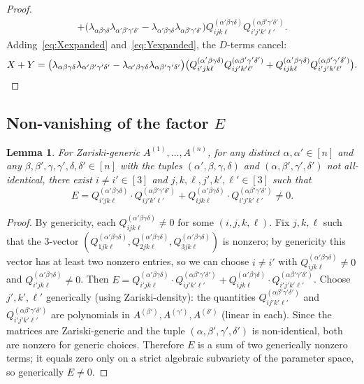 \documentclass[12pt]{article}
\newtheorem{lemma}[theorem]{Lemma}
\begin{document}
\begin{proof}
\begin{align}
  + \bigl(\lambda_{\alpha\beta\gamma\delta}\lambda_{\alpha'\beta'\gamma'\delta'}
    -\lambda_{\alpha'\beta\gamma\delta}\lambda_{\alpha\beta'\gamma'\delta'}\bigr)
    Q^{(\alpha'\beta\gamma\delta)}_{ijk\ell}Q^{(\alpha\beta'\gamma'\delta')}_{i'j'k'\ell'}.
  \label{eq:Yexpanded}
\end{align}
Adding~\eqref{eq:Xexpanded} and~\eqref{eq:Yexpanded}, the $D$-terms cancel:
\[
  X+Y = \bigl(\lambda_{\alpha\beta\gamma\delta}\lambda_{\alpha'\beta'\gamma'\delta'}
    -\lambda_{\alpha'\beta\gamma\delta}\lambda_{\alpha\beta'\gamma'\delta'}\bigr)
    \bigl(Q^{(\alpha'\beta\gamma\delta)}_{i'jk\ell}Q^{(\alpha\beta'\gamma'\delta')}_{ij'k'\ell'}
    + Q^{(\alpha'\beta\gamma\delta)}_{ijk\ell}Q^{(\alpha\beta'\gamma'\delta')}_{i'j'k'\ell'}\bigr). \qedhere
\]
\end{proof}

\subsection{Non-vanishing of the factor \texorpdfstring{$E$}{E}}

\begin{lemma}\label{lem:Enonzero}
For Zariski-generic $A^{(1)},\dots,A^{(n)}$, for any distinct $\alpha,\alpha'\in[n]$ and any
$\beta,\beta',\gamma,\gamma',\delta,\delta'\in[n]$ with the tuples $(\alpha',\beta,\gamma,\delta)$ and
$(\alpha,\beta',\gamma',\delta')$ not all-identical, there exist $i\neq i'\in[3]$ and
$j,k,\ell,j',k',\ell'\in[3]$ such that
\[
  E = Q^{(\alpha'\beta\gamma\delta)}_{i'jk\ell}\cdot Q^{(\alpha\beta'\gamma'\delta')}_{ij'k'\ell'}
    + Q^{(\alpha'\beta\gamma\delta)}_{ijk\ell}\cdot Q^{(\alpha\beta'\gamma'\delta')}_{i'j'k'\ell'} \neq 0.
\]
\end{lemma}

\begin{proof}
By genericity, each $Q^{(\alpha'\beta\gamma\delta)}_{ijk\ell}\neq 0$ for some $(i,j,k,\ell)$.
Fix $j,k,\ell$ such that the $3$-vector $(Q^{(\alpha'\beta\gamma\delta)}_{1jk\ell},
Q^{(\alpha'\beta\gamma\delta)}_{2jk\ell},Q^{(\alpha'\beta\gamma\delta)}_{3jk\ell})$ is nonzero;
by genericity this vector has at least two nonzero entries, so we can choose $i\neq i'$ with
$Q^{(\alpha'\beta\gamma\delta)}_{ijk\ell}\neq 0$ and $Q^{(\alpha'\beta\gamma\delta)}_{i'jk\ell}\neq 0$.
Then $E = Q^{(\alpha'\beta\gamma\delta)}_{i'jk\ell}\cdot Q^{(\alpha\beta'\gamma'\delta')}_{ij'k'\ell'}
+ Q^{(\alpha'\beta\gamma\delta)}_{ijk\ell}\cdot Q^{(\alpha\beta'\gamma'\delta')}_{i'j'k'\ell'}$.
Choose $j',k',\ell'$ generically (using Zariski-density): the quantities
$Q^{(\alpha\beta'\gamma'\delta')}_{ij'k'\ell'}$ and $Q^{(\alpha\beta'\gamma'\delta')}_{i'j'k'\ell'}$
are polynomials in $A^{(\beta')},A^{(\gamma')},A^{(\delta')}$ (linear in each).
Since the matrices are Zariski-generic and the tuple $(\alpha,\beta',\gamma',\delta')$ is non-identical,
both are nonzero for generic choices.  Therefore $E$ is a sum of two generically nonzero terms;
it equals zero only on a strict algebraic subvariety of the parameter space, so generically $E\neq 0$.
\end{proof}
\end{document}

